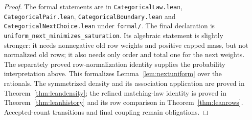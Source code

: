 \documentclass[11pt]{article}
\begin{document}
\begin{proof}
The formal statements are in \texttt{CategoricalLaw.lean},
\texttt{CategoricalPair.lean}, \texttt{CategoricalBoundary.lean} and
\texttt{CategoricalNextChoice.lean} under \texttt{formal/}.
The final declaration is \texttt{uniform\_next\_minimizes\_saturation}.
Its algebraic statement is slightly stronger: it needs nonnegative old
row weights and positive capped mass, but not normalized old rows;
it also needs only order and total one for the next weights.
The separately proved row-normalization identity supplies the probability
interpretation above. This formalizes Lemma~\ref{lem:nextuniform} over
the rationals. The symmetrized density and its association application
are proved in Theorem~\ref{thm:leandensity}; the refined matching-law
identity is proved in Theorem~\ref{thm:leanhistory} and its row comparison
in Theorem~\ref{thm:leanrows}. Accepted-count transitions and final
coupling remain obligations.
\end{proof}
\end{document}

